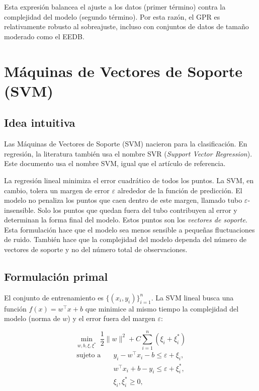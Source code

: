 Esta expresión balancea el ajuste a los datos (primer término) contra la complejidad del modelo (segundo término). Por esta razón, el GPR es relativamente robusto al sobreajuste, incluso con conjuntos de datos de tamaño moderado como el EEDB.

\section{Máquinas de Vectores de Soporte (SVM)}
\label{sec:svr}

\subsection{Idea intuitiva}

Las Máquinas de Vectores de Soporte (SVM) nacieron para la clasificación. En regresión, la literatura también usa el nombre SVR (\textit{Support Vector Regression}). Este documento usa el nombre SVM, igual que el artículo de referencia.

La regresión lineal minimiza el error cuadrático de todos los puntos. La SVM, en cambio, tolera un margen de error $\varepsilon$ alrededor de la función de predicción. El modelo no penaliza los puntos que caen dentro de este margen, llamado tubo $\varepsilon$-insensible. Solo los puntos que quedan fuera del tubo contribuyen al error y determinan la forma final del modelo. Estos puntos son los \textit{vectores de soporte}. Esta formulación hace que el modelo sea menos sensible a pequeñas fluctuaciones de ruido. También hace que la complejidad del modelo dependa del número de vectores de soporte y no del número total de observaciones.

\subsection{Formulación primal}

El conjunto de entrenamiento es $\{(x_i,y_i)\}_{i=1}^n$. La SVM lineal busca una función $f(x)=w^\top x + b$ que minimice al mismo tiempo la complejidad del modelo (norma de $w$) y el error fuera del margen $\varepsilon$:

\begin{equation}
\min_{w,b,\xi,\xi^*} \; \frac{1}{2}\lVert w \rVert^2 + C\sum_{i=1}^n (\xi_i+\xi_i^*)
\label{eq:svr_primal}
\end{equation}
\begin{align}
\text{sujeto a}\quad & y_i - w^\top x_i - b \le \varepsilon + \xi_i, \\
& w^\top x_i + b - y_i \le \varepsilon + \xi_i^*, \\
& \xi_i,\xi_i^* \ge 0,
\end{align}


